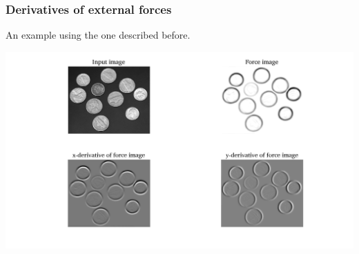 \documentclass[10pt]{beamer}
\begin{document}
 \begin{frame}
   \frametitle{Derivatives of external forces}
   An example using the one described before.
   \begin{center}
     \includegraphics[width=1\textwidth]{FIGURES/externforces}
   \end{center}
 \end{frame}
\end{document}

